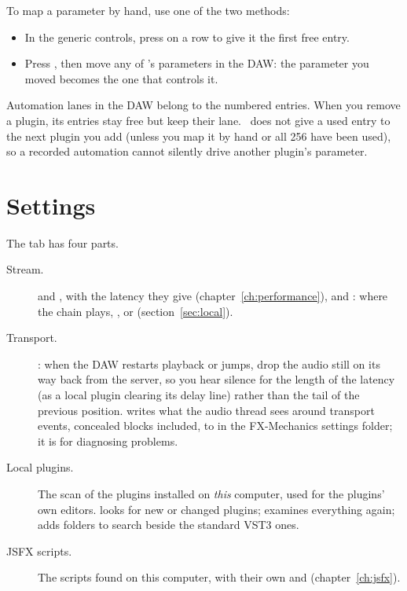 To map a parameter by hand, use one of the two methods:

\begin{itemize}
  \item In the generic controls, press  on a row to give it the first
    free entry.
  \item Press , then move any of \fxme's parameters in the DAW: the
    parameter you moved becomes the one that controls it.
\end{itemize}

\begin{note}
Automation lanes in the DAW belong to the numbered entries. When you remove a
plugin, its entries stay free but keep their lane. \fxme\ does not give a
used entry to the next plugin you add (unless you map it by hand or all 256
have been used), so a recorded automation cannot silently drive another
plugin's parameter.
\end{note}

\section{Settings}

The  tab has four parts.

\begin{description}
  \item[Stream.]  and , with the latency
    they give (chapter~\ref{ch:performance}), and : where the
    chain plays, ,  or  (section~\ref{sec:local}).
  \item[Transport.] : when the DAW restarts
    playback or jumps, drop the audio still on its way back from the server,
    so you hear silence for the length of the latency (as a local plugin
    clearing its delay line) rather than the tail of the previous position.
     writes what the audio thread sees around
    transport events, concealed blocks included, to
     in the FX-Mechanics settings folder; it
    is for diagnosing problems.
  \item[Local plugins.] The scan of the plugins installed on \emph{this}
    computer, used for the plugins' own editors.  looks for new or
    changed plugins;  examines everything again;
     adds folders to search beside the standard VST3 ones.
  \item[JSFX scripts.] The scripts found on this computer, with their own
     and  (chapter~\ref{ch:jsfx}).
\end{description}

